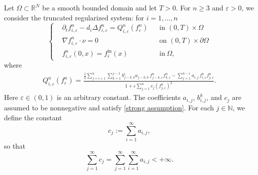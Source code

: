 \documentclass[a4paper,12pt,reqno]{amsart}
\theoremstyle{plain}
\numberwithin{equation}{section}
\begin{document}
	Let $\Omega \subset \mathbb{R}^N$ be a smooth bounded domain and let $T>0$.
	For $n \ge 3$ and $\varepsilon>0$, we consider the truncated regularized
	system: for $i=1,\dots,n$
	\begin{equation}
		\label{eq:TRNFE}
		\left\{
		\begin{aligned}
			& \partial_t f_{i,\varepsilon}^n - d_i \Delta f_{i,\varepsilon}^n
			= Q_{i,\varepsilon}^n(f_{\varepsilon}^n)
			&& \text{in } (0,T)\times\Omega \\
			& \nabla f_{i,\varepsilon}^n \cdot \nu = 0
			&& \text{on } (0,T)\times\partial\Omega \\
			& f_{i,\varepsilon}^n(0,x) = f_i^{\mathrm{in}}(x)
			&& \text{in}\ \Omega,
		\end{aligned}
		\right.
	\end{equation}
	where
	\begin{align}
		\label{eq:TRNFEoperator}
		Q_{i,\varepsilon}^n(f_{\varepsilon}^n)
		= \frac{
			\frac{1}{2}\displaystyle\sum_{j=i+1}^{n}\sum_{k=1}^{j-1}
			b_{j-k,k}^i a_{j-k,k}\,
			f_{j-k,\varepsilon}^n f_{k,\varepsilon}^n
			-
			\displaystyle\sum_{j=1}^{n-i}
			a_{i,j}\, f_{i,\varepsilon}^n f_{j,\varepsilon}^n
		}{
			1 + \varepsilon\displaystyle\sum_{j=1}^{n}
			c_j (f_{j,\varepsilon}^n)^2
		}.
	\end{align}
	Here $\varepsilon\in(0,1)$ is an arbitrary constant. The coefficients $a_{i,j}$, $b_{i,j}^k$, and $c_j$ are assumed to be nonnegative and satisfy \ref{strong assumption}. For each $j \in \mathbb{N}$, we define the constant
	\[
	c_j := \sum_{i=1}^{\infty} a_{i,j},
	\]
	so that
	\[
	\sum_{j=1}^{\infty} c_j
	= \sum_{j=1}^{\infty}\sum_{i=1}^{\infty} a_{i,j}
	< +\infty.
	\]
\end{document}
